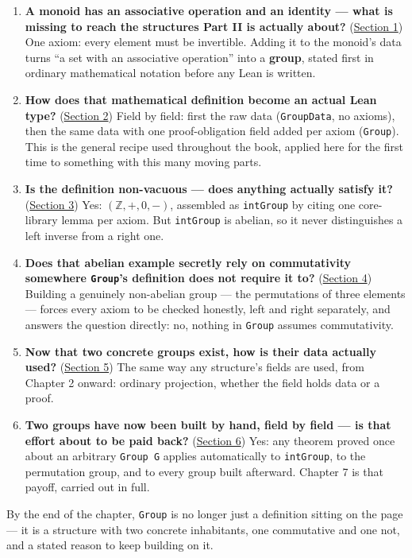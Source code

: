 \begin{enumerate}
\def\labelenumi{\arabic{enumi}.}
\tightlist
\item
  \textbf{A monoid has an associative operation and an identity --- what is missing to reach the structures Part II is actually about?} (\hyperref[sec:06-groups:01-definition:1]{Section 1}) One axiom: every element must be invertible. Adding it to the monoid's data turns ``a set with an associative operation'' into a \textbf{group}, stated first in ordinary mathematical notation before any Lean is written.
\item
  \textbf{How does that mathematical definition become an actual Lean type?} (\hyperref[sec:06-groups:02-translating:1]{Section 2}) Field by field: first the raw data (\texttt{GroupData}, no axioms), then the same data with one proof-obligation field added per axiom (\texttt{Group}). This is the general recipe used throughout the book, applied here for the first time to something with this many moving parts.
\item
  \textbf{Is the definition non-vacuous --- does anything actually satisfy it?} (\hyperref[sec:06-groups:03-integers-example:1]{Section 3}) Yes: \((\mathbb{Z}, +, 0, -)\), assembled as \texttt{intGroup} by citing one core-library lemma per axiom. But \texttt{intGroup} is abelian, so it never distinguishes a left inverse from a right one.
\item
  \textbf{Does that abelian example secretly rely on commutativity somewhere \texttt{Group}'s definition does not require it to?} (\hyperref[sec:06-groups:04-permutations-example:1]{Section 4}) Building a genuinely non-abelian group --- the permutations of three elements --- forces every axiom to be checked honestly, left and right separately, and answers the question directly: no, nothing in \texttt{Group} assumes commutativity.
\item
  \textbf{Now that two concrete groups exist, how is their data actually used?} (\hyperref[sec:06-groups:05-accessing-fields:1]{Section 5}) The same way any structure's fields are used, from Chapter 2 onward: ordinary projection, whether the field holds data or a proof.
\item
  \textbf{Two groups have now been built by hand, field by field --- is that effort about to be paid back?} (\hyperref[sec:06-groups:06-why-bundle:1]{Section 6}) Yes: any theorem proved once about an arbitrary \texttt{Group G} applies automatically to \texttt{intGroup}, to the permutation group, and to every group built afterward. Chapter 7 is that payoff, carried out in full.
\end{enumerate}

By the end of the chapter, \texttt{Group} is no longer just a definition sitting on the page --- it is a structure with two concrete inhabitants, one commutative and one not, and a stated reason to keep building on it.









